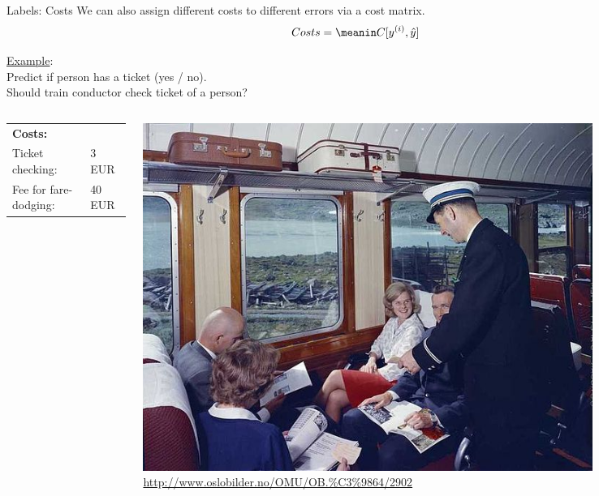 \begin{vbframe}{Labels: Costs}
We can also assign different costs to different errors via a cost matrix.
\[
  Costs = \meanin C[\yi, \yih]
\]

\underline{Example}:\\ 



Predict if person has a ticket (yes / no).\\ 
Should train conductor check ticket of a person?\\

\begin{columns}
\begin{column}{0.5\textwidth}


  \begin{tabular}{ll}
    \textbf{Costs:} & \\
    Ticket checking:& 3 EUR\\
    Fee for fare-dodging:& 40 EUR\\
  \end{tabular}
  
\end{column}
\begin{column}{0.5\textwidth} 

   \includegraphics[width=0.8\textwidth]{figure_man/conductor.jpg}
    {\tiny \url{http://www.oslobilder.no/OMU/OB.%C3%9864/2902}}
   
\end{column}
\end{columns}

\end{vbframe}


